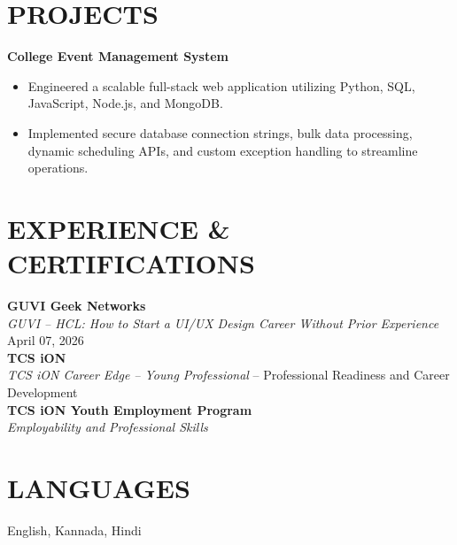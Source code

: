 \documentclass{article}
\begin{document}
\section*{PROJECTS}
\textbf{College Event Management System} \\
\begin{itemize}
    \item Engineered a scalable full-stack web application utilizing Python, SQL, JavaScript, Node.js, and MongoDB.
    \item Implemented secure database connection strings, bulk data processing, dynamic scheduling APIs, and custom exception handling to streamline operations.
\end{itemize}

\section*{EXPERIENCE \& CERTIFICATIONS}
\textbf{GUVI Geek Networks} \\
\textit{GUVI – HCL: How to Start a UI/UX Design Career Without Prior Experience} \hfill April 07, 2026 \\[4pt]
\textbf{TCS iON} \\
\textit{TCS iON Career Edge – Young Professional} – Professional Readiness and Career Development \\[4pt]
\textbf{TCS iON Youth Employment Program} \\
\textit{Employability and Professional Skills}

\section*{LANGUAGES}
English, Kannada, Hindi
\end{document}
